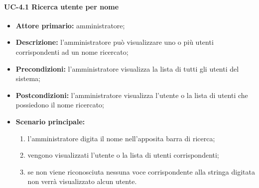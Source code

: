    \paragraph{UC-4.1 Ricerca utente per nome}
    \begin{itemize}
        \item \textbf{Attore primario:} amministratore; 
    
        \item \textbf{Descrizione:} l'amministratore può visualizzare uno o più utenti corrispondenti ad un nome ricercato;
    
        \item \textbf{Precondizioni:} l'amministratore visualizza la lista di tutti gli utenti del sistema;
    
        \item \textbf{Postcondizioni:} l'amministratore visualizza l'utente o la lista di utenti che possiedono il nome ricercato;
    
        \item \textbf{Scenario principale:}
              \begin{enumerate}
                  \item l'amministratore digita il nome nell'apposita barra di ricerca;
                  \item vengono visualizzati l'utente o la lista di utenti corrispondenti;
                  \item se non viene riconosciuta nessuna voce corrispondente alla stringa digitata non verrà visualizzato alcun utente.
              \end{enumerate}
    \end{itemize}

